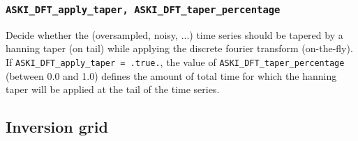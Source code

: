 \documentclass[12pt,a4paper]{article}
\newcommand{\lcode}[1]{\nolinkurl{#1}}
\begin{document}
\subsubsection*{\lcode{ASKI_DFT_apply_taper, ASKI_DFT_taper_percentage}}
Decide whether the (oversampled, noisy, ...) time series should be tapered by a hanning taper (on tail)
while applying the discrete fourier transform (on-the-fly). If \lcode{ASKI_DFT_apply_taper = .true.},
the value of \lcode{ASKI_DFT_taper_percentage} (between 0.0 and 1.0) defines the amount of
total time for which the hanning taper will be applied at the tail of the time series.
\subsection{Inversion grid}
\end{document}
